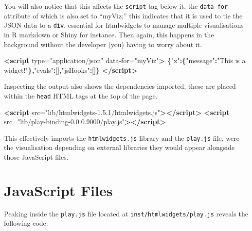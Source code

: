 \documentclass[10pt,]{krantz}
\makeatletter
\newenvironment{Shaded}{\begin{snugshade}}{\end{snugshade}}
\newcommand{\KeywordTok}[1]{\textcolor[rgb]{0.27,0.27,0.27}{\textbf{#1}}}
\newcommand{\NormalTok}[1]{#1}
\newcommand{\OperatorTok}[1]{\textcolor[rgb]{0.43,0.43,0.43}{\textbf{#1}}}
\newcommand{\OtherTok}[1]{\textcolor[rgb]{0.37,0.37,0.37}{#1}}
\newcommand{\StringTok}[1]{\textcolor[rgb]{0.5,0.5,0.5}{#1}}
\newenvironment{kframe}{%
\medskip{}
\setlength{\fboxsep}{.8em}
 \def\at@end@of@kframe{}%
 \ifinner\ifhmode%
  \def\at@end@of@kframe{\end{minipage}}%
  \begin{minipage}{\columnwidth}%
 \fi\fi%
 \def\FrameCommand##1{\hskip\@totalleftmargin \hskip-\fboxsep
 \colorbox{shadecolor}{##1}\hskip-\fboxsep
     \hskip-\linewidth \hskip-\@totalleftmargin \hskip\columnwidth}%
 \MakeFramed {\advance\hsize-\width
   \@totalleftmargin\z@ \linewidth\hsize
   \@setminipage}}%
 {\par\unskip\endMakeFramed%
 \at@end@of@kframe}
\renewenvironment{Shaded}{\begin{kframe}}{\end{kframe}}
\makeatother
\begin{document}
You will also notice that this affects the \texttt{script} tag below it, the \texttt{data-for} attribute of which is also set to ``myViz;'' this indicates that it is used to tie the JSON data to a \texttt{div}, essential for htmlwidgets to manage multiple visualisations in R markdown or Shiny for instance. Then again, this happens in the background without the developer (you) having to worry about it.

\begin{Shaded}
\begin{Highlighting}[]
\KeywordTok{<script}\OtherTok{ type=}\StringTok{"application/json"} 
\OtherTok{  data-for=}\StringTok{"myViz"}\KeywordTok{>}
  \OperatorTok{\{}\StringTok{"x"}\OperatorTok{:\{}\StringTok{"message"}\OperatorTok{:}\StringTok{"This is a widget!"}\OperatorTok{\},}\StringTok{"evals"}\OperatorTok{:}\NormalTok{[]}\OperatorTok{,}\StringTok{"jsHooks"}\OperatorTok{:}\NormalTok{[]}\OperatorTok{\}}
\KeywordTok{</script>}
\end{Highlighting}
\end{Shaded}

Inspecting the output also shows the dependencies imported, these are placed within the \texttt{head} HTML tags at the top of the page.

\begin{Shaded}
\begin{Highlighting}[]
\KeywordTok{<script}\OtherTok{ src=}\StringTok{"lib/htmlwidgets-1.5.1/htmlwidgets.js"}\KeywordTok{></script>}
\KeywordTok{<script}\OtherTok{ src=}\StringTok{"lib/play-binding-0.0.0.9000/play.js"}\KeywordTok{></script>}
\end{Highlighting}
\end{Shaded}

This effectively imports the \texttt{htmlwidgets.js} library and the \texttt{play.js} file, were the visualisation depending on external libraries they would appear alongside those JavaScript files.

\hypertarget{widgets-first-js-files}{%
\section{JavaScript Files}\label{widgets-first-js-files}}

Peaking inside the \texttt{play.js} file located at \texttt{inst/htmlwidgets/play.js} reveals the following code:
\end{document}
